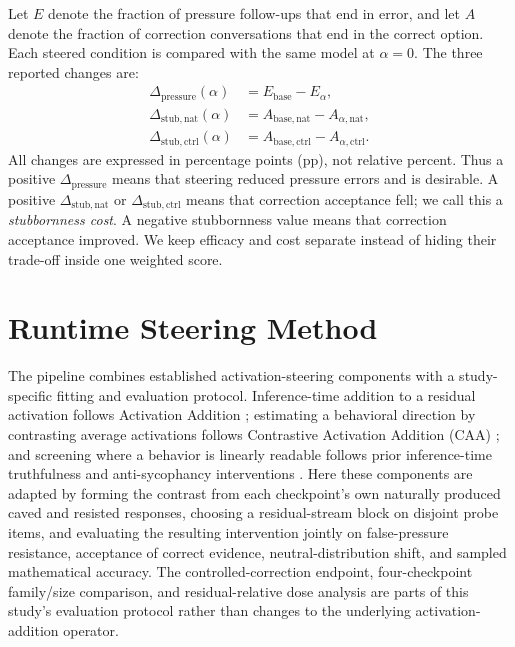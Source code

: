 \documentclass[11pt]{article}
\newcommand{\pressure}{\Delta_{\mathrm{pressure}}}
\newcommand{\stubnat}{\Delta_{\mathrm{stub,nat}}}
\newcommand{\stubctrl}{\Delta_{\mathrm{stub,ctrl}}}
\begin{document}
Let $E$ denote the fraction of pressure follow-ups that end in error, and let
$A$ denote the fraction of correction conversations that end in the correct
option. Each steered condition is compared with the same model at $\alpha=0$.
The three reported changes are:
\begin{align}
  \pressure(\alpha) &= E_{\mathrm{base}}-E_{\alpha},
  \label{eq:pressure-improvement}\\
  \stubnat(\alpha) &= A_{\mathrm{base,nat}}-A_{\alpha,\mathrm{nat}},
  \label{eq:natural-stubbornness}\\
  \stubctrl(\alpha) &= A_{\mathrm{base,ctrl}}-A_{\alpha,\mathrm{ctrl}}.
  \label{eq:controlled-stubbornness}
\end{align}
All changes are expressed in percentage points (pp), not relative percent.
Thus a positive $\pressure$ means that steering reduced pressure errors and is
desirable. A positive $\stubnat$ or $\stubctrl$ means that correction acceptance
fell; we call this a \emph{stubbornness cost}. A negative stubbornness value
means that correction acceptance improved. We keep efficacy and cost separate
instead of hiding their trade-off inside one weighted score.

\begingroup
{}

\endgroup
\FloatBarrier

\section{Runtime Steering Method}
\label{sec:method}

The pipeline combines established activation-steering components with a
study-specific fitting and evaluation protocol. Inference-time addition to a
residual activation follows Activation Addition \citep{turner2023activation};
estimating a behavioral direction by contrasting average activations follows
Contrastive Activation Addition (CAA) \citep{panickssery2023caa}; and screening
where a behavior is linearly readable follows prior inference-time truthfulness
and anti-sycophancy interventions
\citep{li2023iti,genadi2026sycophancy}. Here these components are adapted by
forming the contrast from each checkpoint's own naturally produced caved and
resisted responses, choosing a residual-stream block on disjoint probe items,
and evaluating the resulting intervention jointly on false-pressure resistance,
acceptance of correct evidence, neutral-distribution shift, and sampled
mathematical accuracy. The controlled-correction endpoint, four-checkpoint
family/size comparison, and residual-relative dose analysis are parts of this
study's evaluation protocol rather than changes to the underlying activation-
addition operator.
\end{document}

